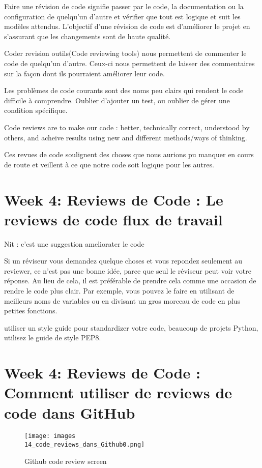 \documentclass[11pt, onecolumn]{article}
\begin{document}
Faire une révision de code signifie passer par le code, la documentation ou la configuration de quelqu'un d'autre et vérifier que tout est logique et suit les modèles attendus. L'objectif d'une révision de code est d'améliorer le projet en s'assurant que les changements sont de haute qualité. 

Coder revision outils(Code reviewing tools) nous permettent de commenter le code de quelqu'un d'autre. Ceux-ci nous permettent de laisser des commentaires sur la façon dont ils pourraient améliorer leur code. 

Les problèmes de code courants sont des noms peu clairs qui rendent le code difficile à comprendre.
Oublier d'ajouter un test, ou oublier de gérer une condition spécifique. 

Code reviews are to make our code : better, technically correct, understood by others, and acheive results using new and different methods/ways of thinking.

Ces revues de code soulignent des choses que nous aurions pu manquer en cours de route et
veillent à ce que notre code soit logique pour les autres.


\section{Week 4: Reviews de Code : Le reviews de code flux de travail}

Nit : c'est une suggestion ameliorater le code 

Si un réviseur vous demandez quelque choses et vous repondez seulement au reviewer, ce n'est pas une bonne idée, parce que seul le réviseur peut voir votre réponse. Au lieu de cela, il est préférable de prendre cela comme une occasion de rendre le code plus clair. Par exemple, vous pouvez le faire en utilisant de meilleurs noms de variables ou en divisant un gros morceau de code en plus petites fonctions.

utiliser un style guide pour standardizer votre code, beaucoup de projets Python, utilisez le guide de style PEP8. 


\section{Week 4: Reviews de Code : Comment utiliser de reviews de code dans GitHub}

\begin{figure}[h]
\begin{center}
\texttt{[image: images\\14\_code\_reviews\_dans\_Github0.png]}
\end{center}
\caption{Github code review screen}
\label{14_code_reviews_dans_Github0}
\end{figure}
\end{document}
